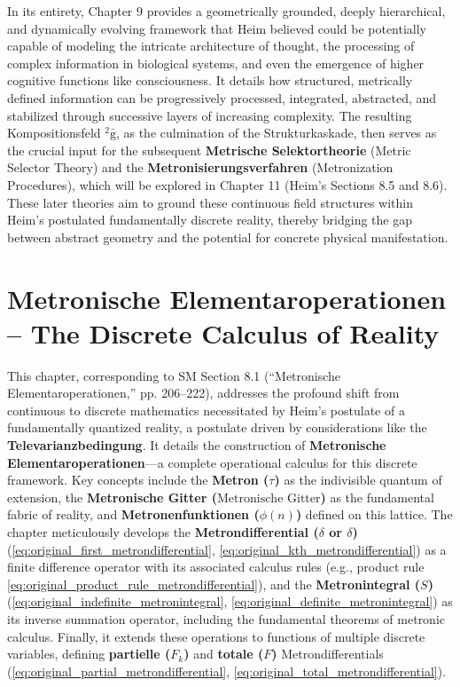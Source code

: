 \documentclass[12pt]{article}
\newcommand{\q}[1]{\enquote{#1}}
\newcommand{\kompositionsfeld}{{}^2\bar{\mathrm{g}}}
\newcommand{\metron}{\tau}
\newcommand{\metronischegitter}{\text{Metronische Gitter}}
\newcommand{\metrondifferential}{\delta}
\newcommand{\metronintegral}{S}
\newcommand{\metronenfunktion}{\phi(n)}
\begin{document}
In its entirety, Chapter 9 provides a geometrically grounded, deeply hierarchical, and dynamically evolving framework that Heim believed could be potentially capable of modeling the intricate architecture of thought, the processing of complex information in biological systems, and even the emergence of higher cognitive functions like consciousness. It details how structured, metrically defined information can be progressively processed, integrated, abstracted, and stabilized through successive layers of increasing complexity. The resulting Kompositionsfeld \( \kompositionsfeld \), as the culmination of the Strukturkaskade, then serves as the crucial input for the subsequent \textbf{Metrische Selektortheorie} (Metric Selector Theory) and the \textbf{Metronisierungsverfahren} (Metronization Procedures), which will be explored in Chapter 11 (Heim's Sections 8.5 and 8.6). These later theories aim to ground these continuous field structures within Heim’s postulated fundamentally discrete reality, thereby bridging the gap between abstract geometry and the potential for concrete physical manifestation.

\clearpage 
\section{Metronische Elementaroperationen – The Discrete Calculus of Reality}
\label{sec:chapter10}

This chapter, corresponding to SM Section 8.1 (\q{Metronische Elementaroperationen,} pp. 206–222), addresses the profound shift from continuous to discrete mathematics necessitated by Heim's postulate of a fundamentally quantized reality, a postulate driven by considerations like the \textbf{Televarianzbedingung}. It details the construction of \textbf{Metronische Elementaroperationen}—a complete operational calculus for this discrete framework. Key concepts include the \textbf{Metron (\(\metron\))} as the indivisible quantum of extension, the \textbf{Metronische Gitter (\(\metronischegitter\))} as the fundamental fabric of reality, and \textbf{Metronenfunktionen (\(\metronenfunktion\))} defined on this lattice. The chapter meticulously develops the \textbf{Metrondifferential (\(\metrondifferential\) or \( \delta \))} (\eqref{eq:original_first_metrondifferential}, \eqref{eq:original_kth_metrondifferential}) as a finite difference operator with its associated calculus rules (e.g., product rule \eqref{eq:original_product_rule_metrondifferential}), and the \textbf{Metronintegral (\(\metronintegral\))} (\eqref{eq:original_indefinite_metronintegral}, \eqref{eq:original_definite_metronintegral}) as its inverse summation operator, including the fundamental theorems of metronic calculus. Finally, it extends these operations to functions of multiple discrete variables, defining \textbf{partielle (\(F_k\))} and \textbf{totale (\(F\))} Metrondifferentials (\eqref{eq:original_partial_metrondifferential}, \eqref{eq:original_total_metrondifferential}).
\end{document}
